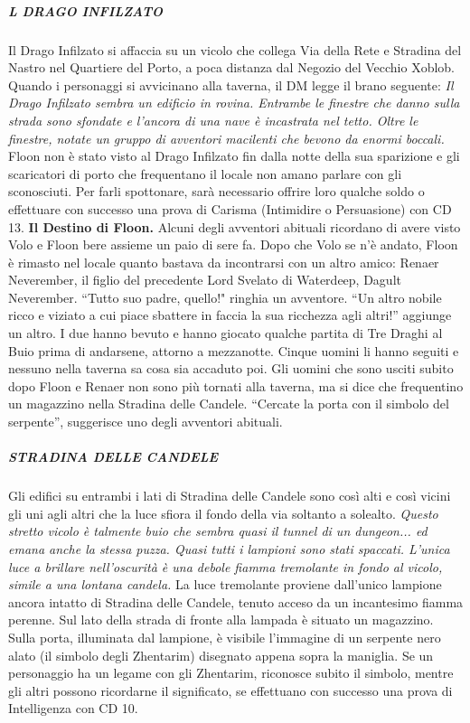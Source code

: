 \documentclass{article}
\begin{document}
\subparagraph{L DRAGO INFILZATO}
Il Drago Infilzato si affaccia su un vicolo che collega Via della Rete e Stradina del Nastro nel Quartiere del Porto, a poca distanza dal Negozio del Vecchio Xoblob. Quando i personaggi si avvicinano alla taverna, il DM legge il brano seguente:\newline
\textit{Il Drago Infilzato sembra un edificio in rovina. Entrambe le finestre che danno sulla strada sono sfondate e l'ancora di una nave è incastrata nel tetto. Oltre le finestre, notate un gruppo di avventori macilenti che bevono da enormi boccali.}\newline
Floon non è stato visto al Drago Infilzato fin dalla notte della sua sparizione e gli scaricatori di porto che frequentano il locale non amano parlare con gli sconosciuti. Per farli spottonare, sarà necessario offrire loro qualche soldo o effettuare con successo una prova di Carisma (Intimidire o Persuasione) con CD 13.\newline
\textbf{Il Destino di Floon.} Alcuni degli avventori abituali ricordano di avere visto Volo e Floon bere assieme un paio di sere fa. Dopo che Volo se n'è andato, Floon è rimasto nel locale quanto bastava da incontrarsi con un altro amico: 
Renaer Neverember, il figlio del precedente Lord Svelato di Waterdeep, Dagult Neverember. “Tutto suo padre, quello!" ringhia un avventore. “Un altro nobile ricco e viziato a cui piace sbattere in faccia la sua ricchezza agli altri!” aggiunge un altro. 
I due hanno bevuto e hanno giocato qualche partita di Tre Draghi al Buio prima di andarsene, attorno a mezzanotte. Cinque uomini li hanno seguiti e nessuno nella taverna sa cosa sia accaduto poi. Gli uomini che sono usciti subito dopo Floon e Renaer non sono più tornati alla taverna, ma si dice che frequentino un magazzino nella Stradina delle Candele. “Cercate la porta con il simbolo del serpente”, suggerisce uno degli avventori abituali.
\subparagraph{STRADINA DELLE CANDELE}
Gli edifici su entrambi i lati di Stradina delle Candele sono così alti e così vicini gli uni agli altri che la luce sfiora il fondo della via soltanto a solealto.\newline
\textit{Questo stretto vicolo è talmente buio che sembra quasi il tunnel di un dungeon... ed emana anche la stessa puzza. 
Quasi tutti i lampioni sono stati spaccati. L'unica luce a brillare nell'oscurità è una debole fiamma tremolante in fondo al vicolo, simile a una lontana candela.}
\newline
La luce tremolante proviene dall'unico lampione ancora intatto di Stradina delle Candele, tenuto acceso da un incantesimo fiamma perenne. Sul lato della strada di fronte alla lampada è situato un magazzino. Sulla porta, illuminata dal lampione, è visibile l'immagine di un serpente nero alato (il simbolo degli Zhentarim) disegnato appena sopra la maniglia. Se un personaggio ha un legame con gli Zhentarim, riconosce subito il simbolo, mentre gli altri possono ricordarne il significato, se effettuano con successo una prova di Intelligenza con CD 10. 
\end{document}
